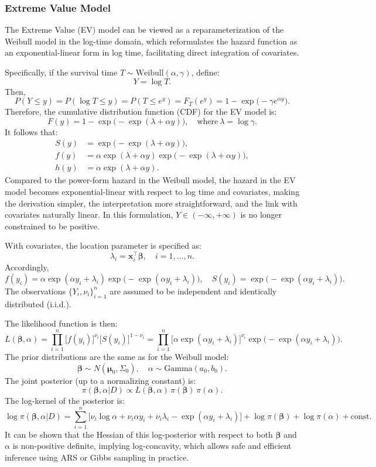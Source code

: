 \subsubsection{Extreme Value Model}
The Extreme Value (EV) model can be viewed as a reparameterization of the Weibull model in the log-time domain, which reformulates the hazard function as an exponential-linear form in log time, facilitating direct integration of covariates.

Specifically, if the survival time $T \sim \text{Weibull}(\alpha, \gamma)$, define:
$$
Y = \log T.
$$
Then,
$$
P(Y \le y) 
= P(\log T \le y)
= P(T \le e^y)
= F_T(e^y)
= 1 - \exp\big( - \gamma e^{\alpha y} \big).
$$
Therefore, the cumulative distribution function (CDF) for the EV model is:
$$
F(y) = 1 - \exp\big( - \exp(\lambda + \alpha y) \big), 
\quad \text{where}~\lambda = \log \gamma.
$$
It follows that:
$$
\begin{aligned}
S(y) &= \exp\big( - \exp(\lambda + \alpha y) \big),\\
f(y) &= \alpha \exp(\lambda + \alpha y) \exp\big( - \exp(\lambda + \alpha y) \big),\\
h(y) &= \alpha \exp(\lambda + \alpha y).
\end{aligned}
$$
Compared to the power-form hazard in the Weibull model, the hazard in the EV model becomes exponential-linear with respect to log time and covariates, making the derivation simpler, the interpretation more straightforward, and the link with covariates naturally linear. In this formulation, $Y \in (-\infty, +\infty)$ is no longer constrained to be positive.

With covariates, the location parameter is specified as:
$$
\lambda_i = \mathbf{x}_i^\top \boldsymbol{\beta}, 
\quad i = 1, \ldots, n.
$$
Accordingly,
$$
f(y_i) = \alpha \exp(\alpha y_i + \lambda_i) \exp\big( -\exp(\alpha y_i + \lambda_i) \big), 
\quad
S(y_i) = \exp\big( -\exp(\alpha y_i + \lambda_i) \big).
$$
The observations $\{ Y_i, \nu_i \}_{i=1}^n$ are assumed to be independent and identically distributed (i.i.d.).

The likelihood function is then:
$$
L(\boldsymbol{\beta}, \alpha) 
= \prod_{i=1}^n 
\big[ f(y_i) \big]^{\nu_i} 
\big[ S(y_i) \big]^{1 - \nu_i}
= \prod_{i=1}^n 
\big[ \alpha \exp(\alpha y_i + \lambda_i) \big]^{\nu_i} 
\exp\big( -\exp(\alpha y_i + \lambda_i) \big).
$$
The prior distributions are the same as for the Weibull model:
$$
\boldsymbol{\beta} \sim N(\boldsymbol{\mu}_0, \Sigma_0), 
\quad 
\alpha \sim \text{Gamma}(a_0, b_0).
$$
The joint posterior (up to a normalizing constant) is:
$$
\pi(\boldsymbol{\beta}, \alpha | D) 
\propto L(\boldsymbol{\beta}, \alpha)
\, \pi(\boldsymbol{\beta}) 
\, \pi(\alpha).
$$
The log-kernel of the posterior is:
$$
\log \pi(\boldsymbol{\beta}, \alpha | D)
= \sum_{i=1}^n 
\big[
\nu_i \log \alpha + \nu_i \alpha y_i + \nu_i \lambda_i - \exp(\alpha y_i + \lambda_i)
\big]
+ \log \pi(\boldsymbol{\beta}) + \log \pi(\alpha) + \text{const}.
$$
It can be shown that the Hessian of this log-posterior with respect to both $\boldsymbol{\beta}$ and $\alpha$ is non-positive definite, implying log-concavity, which allows safe and efficient inference using ARS or Gibbs sampling in practice.
